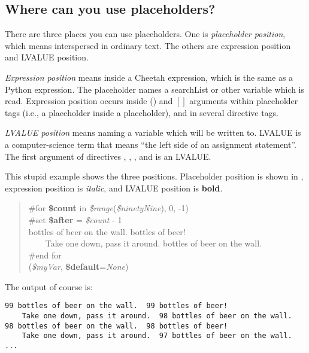 \subsection{Where can you use placeholders?}
\label{language.placeholders.positions}

There are three places you can use placeholders.  One is {\em placeholder
position}, which means interspersed in ordinary text.  The others are expression
position and LVALUE position.

{\em Expression position} means inside a Cheetah expression, which is the same
as a Python expression.  The placeholder names a searchList or other variable
which is read.  Expression position occurs inside () and $[]$ arguments within
placeholder tags (i.e., a placeholder inside a placeholder), and in several
directive tags.

{\em LVALUE position} means naming a variable which will be written to.  LVALUE
is a computer-science term that means ``the left side of an assignment 
statement''.  The first argument of directives , ,
,  and  is an LVALUE.

This stupid example shows the three positions.  Placeholder position is shown
in , expression position is {\em italic}, and LVALUE position is
{\bf bold}.

\begin{quote}
\#for {\bf \$count} in {\em \$range}({\em \$ninetyNine}), 0, -1)\\
\#set {\bf \$after} = {\em \$count} - 1\\
 bottles of beer on the wall.   bottles of beer!\\
~~~~Take one down, pass it around.   bottles of beer on the wall.\\
\#end for\\
({\em \$myVar}, {\bf \$default}={\em None})
\end{quote}

The output of course is:
\begin{verbatim}
99 bottles of beer on the wall.  99 bottles of beer!
    Take one down, pass it around.  98 bottles of beer on the wall.
98 bottles of beer on the wall.  98 bottles of beer!
    Take one down, pass it around.  97 bottles of beer on the wall.
...
\end{verbatim}


